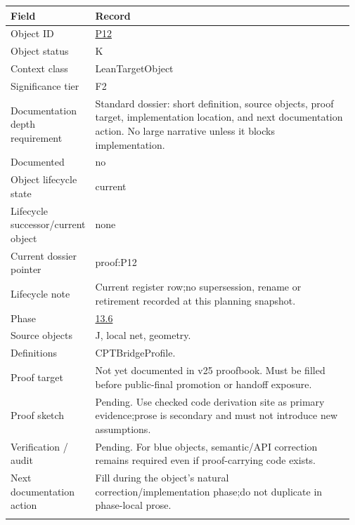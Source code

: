 \begin{longtable}{L{0.16\linewidth} L{0.81\linewidth}}
\hline
\textbf{Field} & \textbf{Record}\\
\hline
Object ID & \hyperlink{object-row-P12}{P12}\\
\hline\addlinespace[0.20em]
Object status & K\\
\hline\addlinespace[0.20em]
Context class & LeanTargetObject\\
\hline\addlinespace[0.20em]
Significance tier & F2\\
\hline\addlinespace[0.20em]
Documentation depth requirement & Standard dossier: short definition, source objects, proof target, implementation location, and next documentation action. No large narrative unless it blocks implementation.\\
\hline\addlinespace[0.20em]
Documented & no\\
\hline\addlinespace[0.20em]
Object lifecycle state & current\\
\hline\addlinespace[0.20em]
Lifecycle successor/\allowbreak{}current object & none\\
\hline\addlinespace[0.20em]
Current dossier pointer & proof:P12\\
\hline\addlinespace[0.20em]
Lifecycle note & Current register row;\newline no supersession, rename or retirement recorded at this planning snapshot.\\
\hline\addlinespace[0.20em]
Phase & \hyperlink{phase-row-13-6}{13.6}\\
\hline\addlinespace[0.20em]
Source objects & J, local net, geometry.\\
\hline\addlinespace[0.20em]
Definitions & CPTBridgeProfile.\\
\hline\addlinespace[0.20em]
Proof target & Not yet documented in v25 proofbook. Must be filled before public-final promotion or handoff exposure.\\
\hline\addlinespace[0.20em]
Proof sketch & Pending. Use checked code derivation site as primary evidence;\newline prose is secondary and must not introduce new assumptions.\\
\hline\addlinespace[0.20em]
Verification /\allowbreak{} audit & Pending. For blue objects, semantic/\allowbreak{}API correction remains required even if proof-carrying code exists.\\
\hline\addlinespace[0.20em]
Next documentation action & Fill during the object's natural correction/\allowbreak{}implementation phase;\newline do not duplicate in phase-local prose.\\
\hline\addlinespace[0.20em]
\end{longtable}
